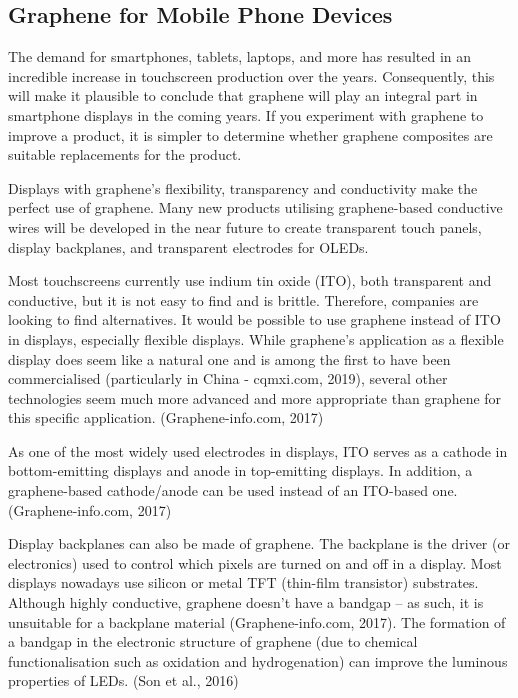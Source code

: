 \documentclass[a4paper,12pt]{article}
\numberwithin{equation}{section}
\numberwithin{figure}{section}
\begin{document}
\subsection{Graphene for Mobile Phone Devices}

\noindent The demand for smartphones, tablets, laptops, and more has resulted in an incredible increase in touchscreen production over the years. Consequently, this will make it plausible to conclude that graphene will play an integral part in smartphone displays in the coming years. If you experiment with graphene to improve a product, it is simpler to determine whether graphene composites are suitable replacements for the product.\vspace{\baselineskip}

\noindent Displays with graphene’s flexibility, transparency and conductivity make the perfect use of graphene. Many new products utilising graphene-based conductive wires will be developed in the near future to create transparent touch panels, display backplanes, and transparent electrodes for OLEDs.\vspace{\baselineskip}

\noindent Most touchscreens currently use indium tin oxide (ITO), both transparent and conductive, but it is not easy to find and is brittle. Therefore, companies are looking to find alternatives. It would be possible to use graphene instead of ITO in displays, especially flexible displays. While graphene’s application as a flexible display does seem like a natural one and is among the first to have been commercialised (particularly in China - cqmxi.com, 2019), several other technologies seem much more advanced and more appropriate than graphene for this specific application. (Graphene-info.com, 2017)\vspace{\baselineskip}

\noindent As one of the most widely used electrodes in displays, ITO serves as a cathode in bottom-emitting displays and anode in top-emitting displays. In addition, a graphene-based cathode/anode can be used instead of an ITO-based one. (Graphene-info.com, 2017)\vspace{\baselineskip}

\noindent Display backplanes can also be made of graphene. The backplane is the driver (or electronics) used to control which pixels are turned on and off in a display. Most displays nowadays use silicon or metal TFT (thin-film transistor) substrates. Although highly conductive, graphene doesn’t have a bandgap – as such, it is unsuitable for a backplane material (Graphene-info.com, 2017). The formation of a bandgap in the electronic structure of graphene (due to chemical functionalisation such as oxidation and hydrogenation) can improve the luminous properties of LEDs. (Son et al., 2016)
\end{document}
